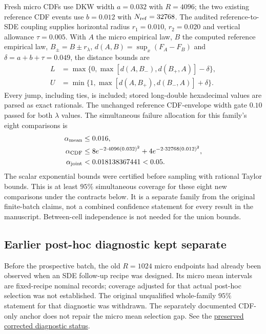 Fresh micro CDFs use DKW width $a=0.032$ with $R=4096$; the two existing reference CDF events use $b=0.012$ with $N_{\rm ref}=32768$. The audited reference-to-SDE coupling supplies horizontal radius $r_1=0.010$, $r_2=0.020$ and vertical allowance $\tau=0.005$. With $A$ the micro empirical law, $B$ the computed reference empirical law, $B_\pm=B\pm r_\lambda$, $d(A,B)=\sup_x(F_A-F_B)$ and $\delta=a+b+\tau=0.049$, the distance bounds are
\begin{align*}
 L&=\max\{0,\max[d(A,B_-),d(B_+,A)]-\delta\},\\
 U&=\min\{1,\max[d(A,B_+),d(B_-,A)]+\delta\}.
\end{align*}
Every jump, including ties, is included; stored long-double hexadecimal values are parsed as exact rationals. The unchanged reference CDF-envelope width gate $0.10$ passed for both $\lambda$ values. The simultaneous failure allocation for this family's eight comparisons is
\begin{align*}
 \alpha_{\rm mean}&\le0.016,\\
 \alpha_{\rm CDF}&\le8e^{-2\cdot4096(0.032)^2}
                +4e^{-2\cdot32768(0.012)^2},\\
 \alpha_{\rm joint}&<0.018138367441<0.05.
\end{align*}
The scalar exponential bounds were certified before sampling with rational Taylor bounds. This is at least $95\%$ simultaneous coverage for these eight new comparisons under the contracts below. It is a separate family from the original finite-batch claims, not a combined confidence statement for every result in the manuscript. Between-cell independence is not needed for the union bounds.


\subsection{Earlier post-hoc diagnostic kept separate}
Before the prospective batch, the old $R=1024$ micro endpoints had already been observed when an SDE follow-up recipe was designed. Its micro mean intervals are fixed-recipe nominal records; coverage adjusted for that actual post-hoc selection was not established. The original unqualified whole-family $95\%$ statement for that diagnostic was withdrawn. The separately documented CDF-only anchor does not repair the micro mean selection gap. See the \href{https://github.com/19991111/huaweipro-tpht-linux/blob/943485ae2be727404deaf50a1dc8c5206782fba2/research/paper_sde_posthoc_erratum_20261017/results/STATUS_CORRECTED.json}{preserved corrected diagnostic status}.
